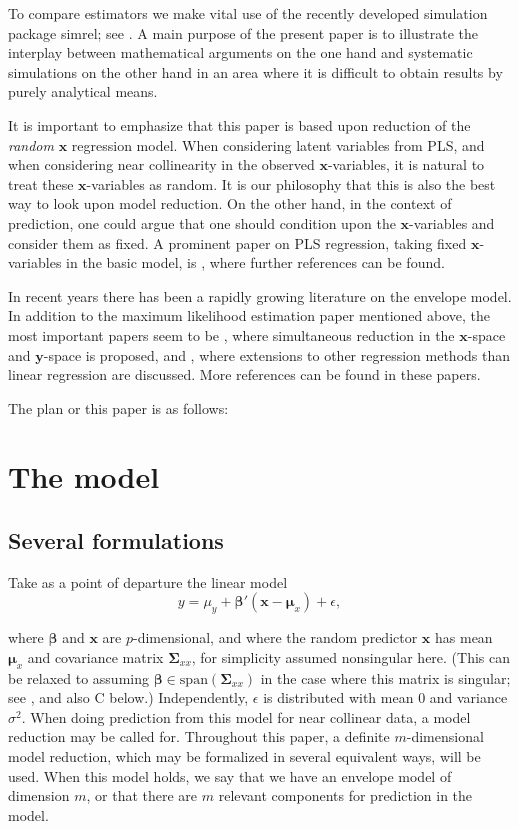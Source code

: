 \documentclass[a4paper, 11pt]{article}
\begin{document}
To compare estimators we make vital use of the recently developed simulation package simrel; see \citet{saebo2015simrel}. A main purpose of the present paper is to illustrate the interplay between mathematical arguments on the one hand and systematic simulations on the other hand in an area where it is difficult to obtain results by purely analytical means.

It is important to emphasize that this paper is based upon reduction of the \emph{random} $\bm{x}$ regression model. When considering latent variables from PLS, and when considering near collinearity in the observed $\bm{x}$-variables, it is natural to treat these $\bm{x}$-variables as random. It is our philosophy that this is also the best way to look upon model reduction. On the other hand, in the context of prediction, one could argue that one should condition upon the $\bm{x}$-variables and consider them as fixed. A prominent paper on PLS regression, taking fixed $\bm{x}$-variables in the basic model, is \citet{kramer2012degrees}, where further references can be found.

In recent years there has been a rapidly growing literature on the envelope model. In addition to the maximum likelihood estimation paper mentioned above, the most important papers seem to be \citet{cook2015simultaneous}, where simultaneous reduction in the $\bm{x}$-space and $\bm{y}$-space is proposed, and \citet{cook2015foundations}, where extensions to other regression methods than linear regression are discussed. More references can be found in these papers.

The plan or this paper is as follows:

\section{The model}

\subsection{Several formulations}

Take as a point of departure the linear model
\begin{equation}
  \label{model}
  y=\mu_{y}+\bm{\beta}'(\bm{x}-\bm{\mu}_{x})+\epsilon,
\end{equation}

where $\bm{\beta}$ and $\bm{x}$ are $p$-dimensional, and where the random predictor $\bm{x}$ has mean $\bm{\mu}_{x}$ and covariance matrix $\bm{\Sigma}_{xx}$, for simplicity assumed nonsingular here. (This can be relaxed to assuming $\bm{\beta}\in\mathrm{span}(\bm{\Sigma}_{xx})$ in the case where this matrix is singular; see \citet{cook2013envelopes}, and also C below.) Independently, $\epsilon$ is distributed with mean $0$ and variance $\sigma^2$. When doing prediction from this model for near collinear data, a model reduction may be called for. Throughout this paper, a definite $m$-dimensional model reduction, which may be formalized in several equivalent ways, will be used. When this model holds, we say that we have an envelope model of dimension $m$, or that there are $m$ relevant components for prediction in the model. \smallskip
\end{document}
